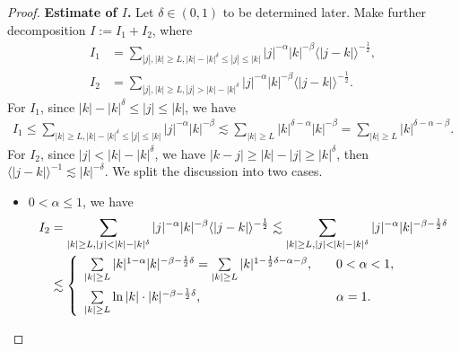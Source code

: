 \documentclass[12pt]{amsart}
\theoremstyle{definition}
\numberwithin{equation}{section}
\begin{document}
\begin{proof}
{\bf Estimate of $I$.} Let $\delta\in (0,1)$ to be determined later. Make further decomposition
$I:=I_1+I_2$,  where
 \begin{align}
I_1 &= \sum_{|j|,|k|\ge L, |k|-|k|^\delta\leq |j|\leq |k|} |j|^{-\alpha}|k|^{-\beta}\langle |j-k|\rangle^{-\frac{1}{2}},\label{equ-426-14}\\
I_2 &= \sum_{|j|,|k|\ge L, |j|> |k|-|k|^\delta} |j|^{-\alpha}|k|^{-\beta}\langle |j-k|\rangle^{-\frac{1}{2}}.\label{equ-426-15}
 \end{align}
For $I_1$,  since $|k|-|k|^\delta\le |j|\le |k|$, we have
\begin{align}\label{equ-426-16}
       I_1       \le  \sum_{|k|\ge L,|k|-|k|^\delta\le|j|\le |k|}|j|^{-\alpha}|k|^{-\beta}
       \lesssim  \sum_{|k|\ge L}|k|^{\delta-\alpha}|k|^{-\beta}=\sum_{|k|\ge L}|k|^{\delta-\alpha-\beta}.
\end{align}
For $I_2$, since $|j|<|k|-|k|^\delta$, we have $|k-j|\ge |k|-|j|\ge |k|^\delta$, then  $\langle |j-k| \rangle^{-1}\lesssim|k|^{-\delta}$. We split the discussion into two cases.
     \begin{itemize}
        \item  $0<\alpha\leq 1$, we have
     \begin{align}
        I_2&= \sum_{|k|\ge L,|j|<|k|-|k|^\delta}|j|^{-\alpha}|k|^{-\beta}\langle |j-k|\rangle^{-\frac{1}{2}}\lesssim \sum_{|k|\ge L,|j|<|k|-|k|^{\delta}}|j|^{-\alpha}|k|^{-\beta-\frac{1}{2}\delta}\nonumber\\
        &\lesssim
     \left\{
     \begin{array}{ll}
     \sum_{|k|\ge L }\limits|k|^{1-\alpha}|k|^{-\beta-\frac{1}{2}\delta}=\sum_{|k|\ge L}\limits|k|^{1-\frac{1}{2}\delta-\alpha-\beta}, \quad & 0<\alpha<1, \vspace{1ex}\\
      \sum_{|k|\ge L }\limits\ln|k|\cdot|k|^{-\beta-\frac{1}{2}\delta}, \quad & \alpha=1.
     \end{array}
     \right. \label{equ-426-17}
     \end{align}


\end{itemize}
\end{proof}
\end{document}
